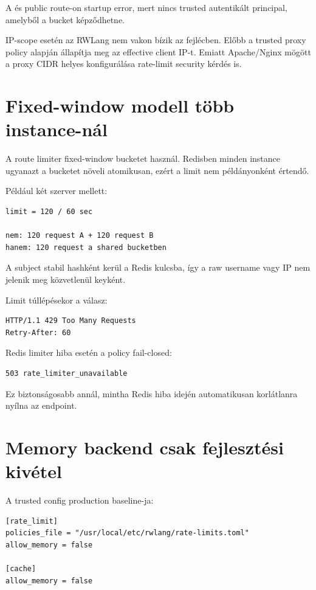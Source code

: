 A  és  public route-on startup error, mert nincs trusted autentikált principal, amelyből a bucket képződhetne.

IP-scope esetén az RWLang nem vakon bízik az  fejlécben. Előbb a trusted proxy policy alapján állapítja meg az effective client IP-t. Emiatt Apache/Nginx mögött a proxy CIDR helyes konfigurálása rate-limit security kérdés is.

\section{Fixed-window modell több instance-nál}

A route limiter fixed-window bucketet használ. Redisben minden instance ugyanazt a bucketet növeli atomikusan, ezért a limit nem példányonként értendő.

Például két szerver mellett:

\begin{lstlisting}
limit = 120 / 60 sec

nem: 120 request A + 120 request B
hanem: 120 request a shared bucketben
\end{lstlisting}

A subject stabil hashként kerül a Redis kulcsba, így a raw username vagy IP nem jelenik meg közvetlenül keyként.

Limit túllépésekor a válasz:

\begin{lstlisting}
HTTP/1.1 429 Too Many Requests
Retry-After: 60
\end{lstlisting}

Redis limiter hiba esetén a policy fail-closed:

\begin{lstlisting}
503 rate_limiter_unavailable
\end{lstlisting}

Ez biztonságosabb annál, mintha Redis hiba idején automatikusan korlátlanra nyílna az endpoint.

\section{Memory backend csak fejlesztési kivétel}

A trusted config production baseline-ja:

\begin{lstlisting}
[rate_limit]
policies_file = "/usr/local/etc/rwlang/rate-limits.toml"
allow_memory = false

[cache]
allow_memory = false
\end{lstlisting}

